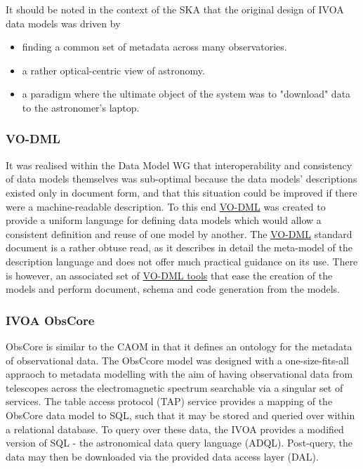 It should be noted in the context of the SKA that the original design of IVOA data models was driven by 
\begin{itemize}
    \item finding a common set of metadata across many observatories.
    \item a rather optical-centric view of astronomy.
    \item a paradigm where the ultimate object of the system was to "download" data to the astronomer's laptop. 
\end{itemize}

\subsubsection{VO-DML}
It was realised within the Data Model WG that interoperability and consistency of data models themselves was sub-optimal because the data models' descriptions existed only in document form, and that this situation could be improved if there were a machine-readable description. To this end \href{https://www.ivoa.net/documents/VODML/}{VO-DML} was created to provide a uniform language for defining data models which would allow a consistent definition and reuse of one model by another. The \href{https://www.ivoa.net/documents/VODML/}{VO-DML} standard document is a rather obtuse read, as it describes in detail the meta-model of the description language and does not offer much practical guidance on its use. There is however, an associated set of \href{https://ivoa.github.io/vo-dml/}{VO-DML tools}
that ease the creation of the models and perform document, schema and code generation from the models.



\subsubsection{IVOA ObsCore}

ObsCore is similar to the CAOM in that it defines an ontology for the metadata of observational data. 
The ObsCcore model was designed with a one-size-fits-all appraoch to metadata modelling with the aim of having observational data from telescopes across the electromagnetic spectrum searchable via a singular set of services.
The table access protocol (TAP) service provides a mapping of the ObsCore data model to SQL, such that it may be stored and queried over within a relational database. 
To query over these data, the IVOA provides a modified version of SQL - the astronomical data query language (ADQL). 
Post-query, the data may then be downloaded via the provided data access layer (DAL).

